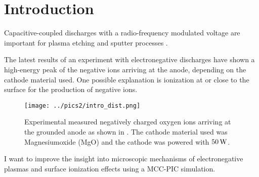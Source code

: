 
\chapter{Introduction}

Capacitive-coupled discharges with a radio-frequency modulated voltage are important for plasma etching \cite{etching} and sputter processes \cite{sputter}.

The latest results of an experiment with electronegative discharges have shown a high-energy peak of the negative ions arriving at the anode, depending on the cathode material used. 
One possible explanation is ionization at or close to the surface for the production of negative ions.

\begin{figure}[htbp]
\centering
    \texttt{[image: ../pics2/intro\_dist.png]}
    \caption{Experimental measured negatively charged oxygen ions arriving at the grounded anode as shown in \cite{basti}. The cathode material used was Magnesiumoxide (MgO) and the cathode was powered with $50\,\mathrm{W}$.}
    \label{fig:intro}
\end{figure}

I want to improve the insight into microscopic mechanisms of electronegative plasmas and surface ionization effects using a MCC-PIC simulation.



